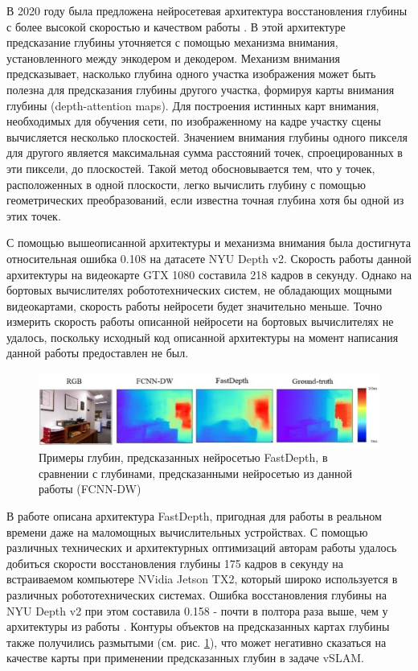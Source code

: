 \documentclass{mipt-thesis-ms}
\begin{document}
	В 2020 году была предложена нейросетевая архитектура восстановления глубины с более высокой скоростью и качеством работы \cite{huynh2020guiding}. В этой архитектуре предсказание глубины уточняется с помощью механизма внимания, установленного между энкодером и декодером. Механизм внимания предсказывает, насколько глубина одного участка изображения может быть полезна для предсказания глубины другого участка, формируя карты внимания глубины (depth-attention maps). Для построения истинных карт внимания, необходимых для обучения сети, по изображенному на кадре участку сцены вычисляется несколько плоскостей. Значением внимания глубины одного пикселя для другого является максимальная сумма расстояний точек, спроецированных в эти пиксели, до плоскостей. Такой метод обосновывается тем, что у точек, расположенных в одной плоскости, легко вычислить глубину с помощью геометрических преобразований, если известна точная глубина хотя бы одной из этих точек.
	
	С помощью вышеописанной архитектуры и механизма внимания была достигнута относительная ошибка 0.108 на датасете NYU Depth v2. Скорость работы данной архитектуры на видеокарте GTX 1080 составила 218 кадров в секунду. Однако на бортовых вычислителях робототехнических систем, не обладающих мощными видеокартами, скорость работы нейросети будет значительно меньше. Точно измерить скорость работы описанной нейросети на бортовых вычислителях не удалось, поскольку исходный код описанной архитектуры на момент написания данной работы предоставлен не был.
	
	\begin{figure}
		\includegraphics[width=1.0\textwidth]{img/fcnn_depths_nyu.png}
		\caption{Примеры глубин, предсказанных нейросетью FastDepth, в сравнении с глубинами, предсказанными нейросетью из данной работы (FCNN-DW)}
		\label{figure_fastdepth_preidctions}
	\end{figure}
	
	В работе \cite{wofk2019fastdepth} описана архитектура FastDepth, пригодная для работы в реальном времени даже на маломощных вычислительных устройствах. С помощью различных технических и архитектурных оптимизаций авторам работы удалось добиться скорости восстановления глубины 175 кадров в секунду на встраиваемом компьютере NVidia Jetson TX2, который широко используется в различных робототехнических системах. Ошибка восстановления глубины на NYU Depth v2 при этом составила 0.158 - почти в полтора раза выше, чем у архитектуры из работы \cite{huynh2020guiding}. Контуры объектов на предсказанных картах глубины также получились размытыми (см. рис. \ref{figure_fastdepth_preidctions}), что может негативно сказаться на качестве карты при применении предсказанных глубин в задаче vSLAM.
	
\end{document}
